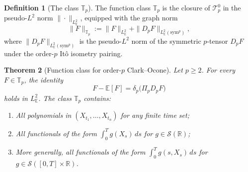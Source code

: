 \documentclass[11pt,reqno]{amsart}
\theoremstyle{plain}
\newtheorem{theorem}{Theorem}[section]
\theoremstyle{definition}
\newtheorem{definition}[theorem]{Definition}
\newcommand{\E}{\mathbb{E}}
\newcommand{\R}{\mathbb{R}}
\newcommand{\sym}{\mathrm{sym}}
\newcommand{\Schw}{\mathcal{S}}
\begin{document}
\begin{definition}[The class $\mathbb{T}_p$]
\label{def:Tp}
The function class $\mathbb{T}_p$ is the closure of $\mathcal{T}_p^0$ in the pseudo-$L^2$ norm $\|\cdot\|_{L^2_\E}$, equipped with the graph norm
\begin{equation}
\|F\|_{\mathbb{T}_p} := \|F\|_{L^2_\E} + \|D_p F\|_{L^2_\E(\sym^p)},
\end{equation}
where $\|D_p F\|_{L^2_\E(\sym^p)}$ is the pseudo-$L^2$ norm of the symmetric $p$-tensor $D_p F$ under the order-$p$ Itô isometry pairing.
\end{definition}

\begin{theorem}[Function class for order-$p$ Clark--Ocone]
\label{thm:funclass}
Let $p \geq 2$. For every $F \in \mathbb{T}_p$, the identity
\begin{equation}
\label{eq:CO-thm}
F - \E[F] = \delta_p\bigl(\Pi_p D_p F\bigr)
\end{equation}
holds in $L^2_\E$. The class $\mathbb{T}_p$ contains:
\begin{enumerate}
\item All polynomials in $(X_{t_1}, \ldots, X_{t_n})$ for any finite time set;
\item All functionals of the form $\int_0^T g(X_s)\, ds$ for $g \in \Schw(\R)$;
\item More generally, all functionals of the form $\int_0^T g(s, X_s)\, ds$ for $g \in \Schw([0,T] \times \R)$.
\end{enumerate}
\end{theorem}
\end{document}
